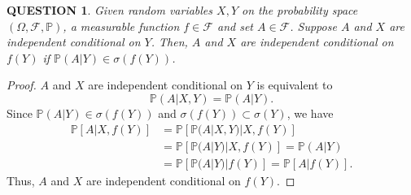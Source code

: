 \documentclass[12pt]{article}
\renewcommand{\(}{\left(}%
\renewcommand{\)}{\right)}%
\renewcommand{\[}{\left[}%
\renewcommand{\]}{\right]}%
\newcommand{\p}{\mathbb{P}}
\newcommand{\f}{\mathscr{F}}
\newtheorem{question}{QUESTION}[section]}
\newtheorem{proof}{Proof.}}
\begin{document}
  \begin{question}
  	Given random variables $X,Y$ on the probability space $(\Omega,\f,\p)$, a measurable function $f\in\f$ and set $A\in\f$. Suppose $A$ and $X$ are independent conditional on $Y$. Then, $A$ and $X$ are independent conditional on $f(Y)$ if $\p(A|Y)\in \sigma(f(Y))$.
  \end{question}
  \begin{proof}
  	$A$ and $X$ are independent conditional on $Y$ is equivalent to
  	\begin{equation*}
  		\p(A|X,Y)=\p(A|Y).
  	\end{equation*}
  	Since $\p(A|Y)\in \sigma(f(Y))$ and $\sigma(f(Y))\subset \sigma(Y)$, we have
  	\begin{equation*}
  		\begin{split}
  			\p[A|X,f(Y)]&=\p[\p(A|X,Y)|X,f(Y)]\\
  			&=\p[\p(A|Y)|X,f(Y)]=\p(A|Y)\\
  			&=\p[\p(A|Y)|f(Y)]=\p[A|f(Y)].
  		\end{split}
  	\end{equation*}
  	Thus, $A$ and $X$ are independent conditional on $f(Y)$.
  \end{proof}
  
\end{document}
